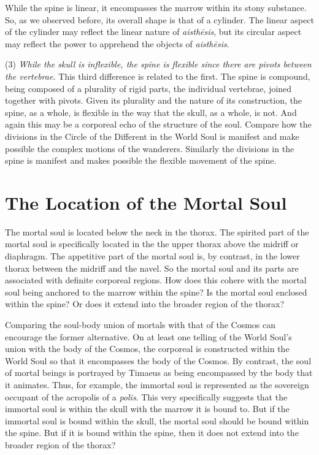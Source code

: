 While the spine is linear, it encompasses the marrow within its stony substance. So, as we observed before, its overall shape is that of a cylinder. The linear aspect of the cylinder may reflect the linear nature of \emph{aisthēsis}, but its circular aspect may reflect the power to apprehend the objects of \emph{aisthēsis}.

(3) \emph{While the skull is inflexible, the spine is flexible since there are pivots between the vertebrae.} This third difference is related to the first. The spine is compound, being composed of a plurality of rigid parts, the individual vertebrae, joined together with pivots. Given its plurality and the nature of its construction, the spine, as a whole, is flexible in the way that the skull, as a whole, is not. And again this may be a corporeal echo of the structure of the soul. Compare how the divisions in the Circle of the Different in the World Soul is manifest and make possible the complex motions of the wanderers. Similarly the divisions in the spine is manifest and makes possible the flexible movement of the spine. 



\section{The Location of the Mortal Soul} %
\label{sec:the_location_of_the_mortal_soul}

The mortal soul is located below the neck in the thorax. The spirited part of the mortal soul is specifically located in the the upper thorax above the midriff or diaphragm. The appetitive part of the mortal soul is, by contrast, in the lower thorax between the midriff and the navel. So the mortal soul and its parts are associated with definite corporeal regions. How does this cohere with the mortal soul being anchored to the marrow within the spine? Is the mortal soul enclosed within the spine? Or does it extend into the broader region of the thorax?

Comparing the soul-body union of mortals with that of the Cosmos can encourage the former alternative. On at least one telling of the World Soul's union with the body of the Cosmos, the corporeal is constructed within the World Soul so that it encompasses the body of the Cosmos. By contrast, the soul of mortal beings is portrayed by Timaeus as being encompassed by the body that it animates. Thus, for example, the immortal soul is represented as the sovereign occupant of the acropolis of a \emph{polis}. This very specifically suggests that the immortal soul is within the skull with the marrow it is bound to. But if the immortal soul is bound within the skull, the mortal soul should be bound within the spine. But if it is bound within the spine, then it does not extend into the broader region of the thorax?

